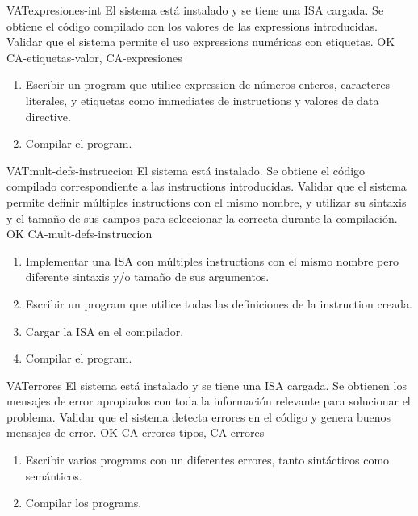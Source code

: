 \begin{testCase}{VAT}{expresiones-int}
    {El sistema está instalado y se tiene una \gls{ISA} cargada.} %
    {Se obtiene el código compilado con los valores de las \glspl{expression} introducidas.} %
    {Validar que el sistema permite el uso \glspl{expression} numéricas con etiquetas.} %
    {OK} %
    {CA-etiquetas-valor, CA-expresiones} %
    \begin{enumerate}[leftmargin=*, topsep=0pt, noitemsep] %
        \item Escribir un \gls{program} que utilice \gls{expression} de números
        enteros, caracteres literales, y etiquetas como \glspl{immediate} de
        \glspl{instruction} y valores de \gls{data directive}.
        \item Compilar el \gls{program}.
    \end{enumerate}
\end{testCase}

\begin{testCase}{VAT}{mult-defs-instruccion}
    {El sistema está instalado.} %
    {Se obtiene el código compilado correspondiente a las \glspl{instruction} introducidas.} %
    {Validar que el sistema permite definir múltiples \glspl{instruction} con
    el mismo nombre, y utilizar su sintaxis y el tamaño de sus campos para
    seleccionar la correcta durante la compilación.} %
    {OK} %
    {CA-mult-defs-instruccion} %
    \begin{enumerate}[leftmargin=*, topsep=0pt, noitemsep] %
        \item Implementar una \gls{ISA} con múltiples \glspl{instruction} con el
        mismo nombre pero diferente sintaxis y/o tamaño de sus argumentos.
        \item Escribir un \gls{program} que utilice todas las definiciones de la
        \gls{instruction} creada.
        \item Cargar la \gls{ISA} en el compilador.
        \item Compilar el \gls{program}.
    \end{enumerate}
\end{testCase}

\begin{testCase}{VAT}{errores}
    {El sistema está instalado y se tiene una \gls{ISA} cargada.} %
    {Se obtienen los mensajes de error apropiados con toda la información
    relevante para solucionar el problema.} %
    {Validar que el sistema detecta errores en el código 
    y genera buenos mensajes de error.} %
    {OK} %
    {CA-errores-tipos, CA-errores} %
    \begin{enumerate}[leftmargin=*, topsep=0pt, noitemsep] %
        \item Escribir varios \glspl{program} con un diferentes errores, tanto
        sintácticos como semánticos.
        \item Compilar los \glspl{program}.
    \end{enumerate}
\end{testCase}

